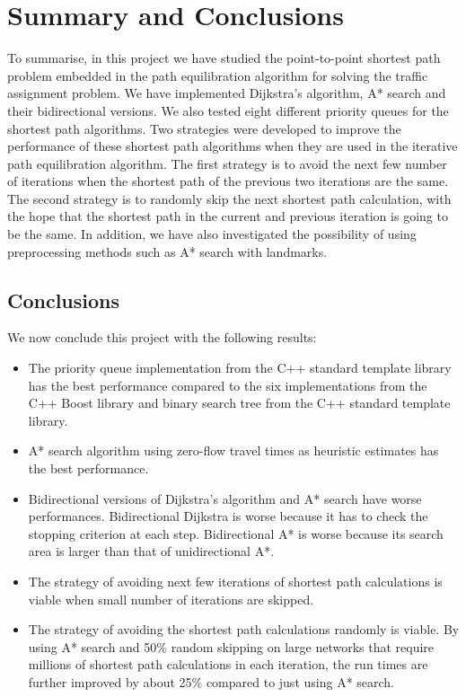 \chapter{Summary and Conclusions} \label{chap:conclusions}
To summarise,
in this project we have studied the point-to-point shortest path problem embedded in the path equilibration algorithm for solving the traffic assignment problem.
We have implemented Dijkstra's algorithm, A* search and their bidirectional versions.
We also tested eight different priority queues for the shortest path algorithms.
Two strategies were developed to improve the performance of these shortest path algorithms when they are used in the iterative path equilibration algorithm.
The first strategy is to avoid the next few number of iterations
when the shortest path of the previous two iterations are the same.
The second strategy is to randomly skip the next shortest path calculation,
with the hope that the shortest path in the current and previous iteration is going to be the same.
In addition,
we have also investigated the possibility of using preprocessing methods such as A* search with landmarks.

\section{Conclusions}
We now conclude this project with the following results:
\begin{itemize}
    \item The priority queue implementation from the C++ standard template library has the best performance compared to the six implementations from the C++ Boost library and binary search tree from the C++ standard template library.
    \item A* search algorithm using zero-flow travel times as heuristic estimates has the best performance.
    \item Bidirectional versions of Dijkstra's algorithm and A* search have worse performances. Bidirectional Dijkstra is worse because it has to check the stopping criterion at each step. Bidirectional A* is worse because its search area is larger than that of unidirectional A*.
    \item The strategy of avoiding next few iterations of shortest path calculations is viable when small number of iterations are skipped.
    \item The strategy of avoiding the shortest path calculations randomly is viable. By using A* search and 50\% random skipping on large networks that require millions of shortest path calculations in each iteration, the run times are further improved by about 25\% compared to just using A* search.
\end{itemize}

